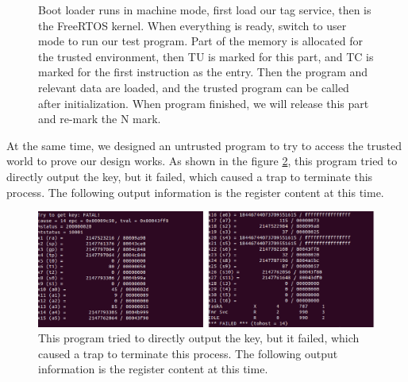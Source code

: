 \documentclass[conference]{IEEEtran}
\begin{document}
\begin{figure}
	\caption{Boot loader runs in machine mode, first load our tag service, then is the FreeRTOS kernel. When everything is ready, switch to user mode to run our test program. Part of the memory is allocated for the trusted environment, then TU is marked for this part, and TC is marked for the first instruction as the entry. Then the program and relevant data are loaded, and the trusted program can be called after initialization. When program finished, we will release this part and re-mark the N mark.}
	\label{fig:demo_output}
\end{figure}


At the same time, we designed an untrusted program to try to access the trusted world to prove our design works. As shown in the figure \ref{fig:demo_fail}, this program tried to directly output the key, but it failed, which caused a trap to terminate this process. The following output information is the register content at this time.

\begin{figure}
	\includegraphics[width=\columnwidth]{asset/Demo1.eps}
	\caption{This program tried to directly output the key, but it failed, which caused a trap to terminate this process. The following output information is the register content at this time.}
	\label{fig:demo_fail}
\end{figure}
\end{document}
